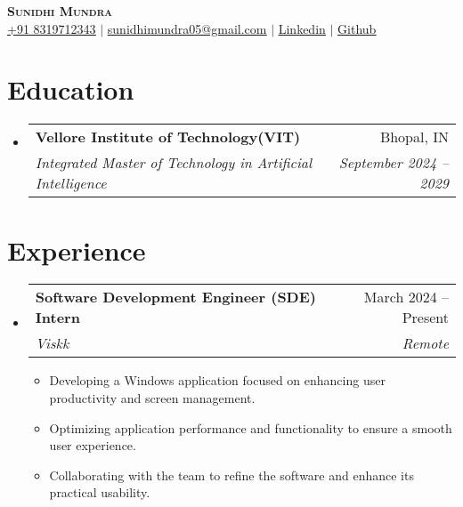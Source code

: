 \documentclass[letterpaper,11pt]{article}
\makeatletter
\newcommand{\resumeItem}[1]{
  \item\small{
    {#1 \vspace{-2pt}}
  }
}
\newcommand{\resumeSubheading}[4]{
  \vspace{-2pt}\item
    \begin{tabular*}{0.97\textwidth}[t]{l@{\extracolsep{\fill}}r}
      \textbf{#1} & #2 \\
      \textit{\small#3} & \textit{\small #4} \\
    \end{tabular*}\vspace{-7pt}
}
\newcommand{\resumeSubHeadingListStart}{\begin{itemize}[leftmargin=0.15in, label={}]}
\newcommand{\resumeSubHeadingListEnd}{\end{itemize}}
\newcommand{\resumeItemListStart}{\begin{itemize}}
\newcommand{\resumeItemListEnd}{\end{itemize}\vspace{-5pt}}
\makeatother
\begin{document}
\begin{center}
    \textbf{\Huge \scshape Sunidhi Mundra} \\ \vspace{1pt}
    \href{tel:+918319712343}{\underline{+91 8319712343}} $|$ \href{mailto:sunidhimundra05@gmail.com}{\underline{sunidhimundra05@gmail.com}} $|$ 
    \href{www.linkedin.com/in/sunidhi-mundra}{\underline{Linkedin}} $|$
    \href{https://github.com/foundsunidhi}{\underline{Github}}
\end{center}

\section{Education}
  \resumeSubHeadingListStart
    \resumeSubheading
      {Vellore Institute of Technology(VIT) }{Bhopal, IN}
      {Integrated Master of Technology in Artificial Intelligence}{September 2024 -- 2029}
  \resumeSubHeadingListEnd

\section{Experience}
  \resumeSubHeadingListStart
   \resumeSubheading
      {Software Development Engineer (SDE) Intern}{March 2024 -- Present}
      {Viskk}{Remote}
      \resumeItemListStart
       \resumeItem{Developing a Windows application focused on enhancing user productivity and screen management.}
        \resumeItem{Optimizing application performance and functionality to ensure a smooth user experience.}
        \resumeItem{Collaborating with the team to refine the software and enhance its practical usability.}
      \resumeItemListEnd
  \resumeSubHeadingListEnd

\end{document}
